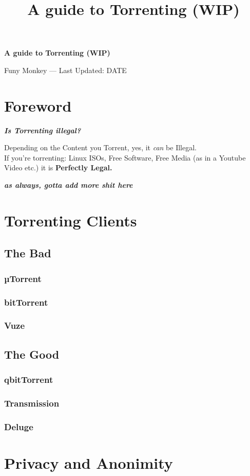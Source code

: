 \documentclass{article}
\title{A guide to Torrenting (WIP)}
\renewcommand{\maketitle}{
	\begin{center}
		{\huge\bfseries
		A guide to Torrenting (WIP)}
		\vspace{.25em}

		Funy Monkey --- Last Updated: DATE
	\end{center}
}
\begin{document}
\maketitle
\tableofcontents

\section{Foreword}
	\textbf{\textit{Is Torrenting illegal?}}

	Depending on the Content you Torrent, yes, it \textit{can} be Illegal. \\
	If you're torrenting: Linux ISOs, Free Software, Free Media (as in a Youtube Video etc.) it is \textbf{Perfectly Legal.}
	
	\textbf{\textit{as always, gotta add more shit here}}
\section{Torrenting Clients}
	\subsection{The Bad}
		\subsubsection{µTorrent}
		\subsubsection{bitTorrent}
		\subsubsection{Vuze}
	\subsection{The Good}
		\subsubsection{qbitTorrent}
		\subsubsection{Transmission}
		\subsubsection{Deluge}
\section{Privacy and Anonimity}
\end{document}
